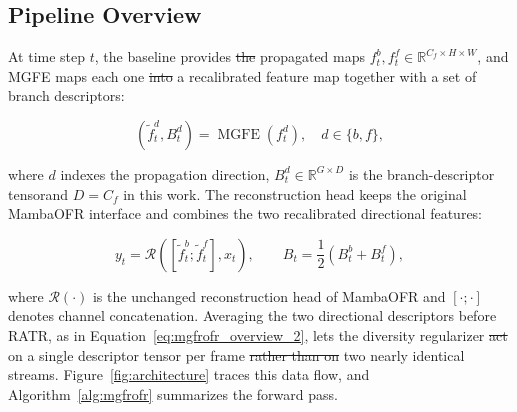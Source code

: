 \documentclass[symmetry,article,submit,pdftex,moreauthors]{Definitions/mdpi}
\providecommand{\DIFadd}[1]{{\protect\color{blue}\uwave{#1}}} %
\providecommand{\DIFdel}[1]{{\protect\color{red}\sout{#1}}}                      %
\providecommand{\DIFaddbegin}{} %
\providecommand{\DIFaddend}{} %
\providecommand{\DIFdelbegin}{} %
\providecommand{\DIFdelend}{} %
\begin{document}
\subsection{Pipeline Overview}
\label{subsec:overview}

At time step $t$, the baseline provides \DIFdelbegin \DIFdel{the }\DIFdelend propagated maps $f_t^{b}, f_t^{f} \in \mathbb{R}^{C_f \times H \times W}$, and MGFE maps each one \DIFdelbegin \DIFdel{into }\DIFdelend \DIFaddbegin \DIFadd{to }\DIFaddend a recalibrated feature map together with a set of branch descriptors:

\begin{equation}
\left(\widetilde{f}_t^{d}, B_t^{d}\right)=\operatorname{MGFE}\!\left(f_t^{d}\right), \quad d \in \{b,f\},
\end{equation}

where $d$ indexes the propagation direction, $B_t^{d} \in \mathbb{R}^{G \times D}$ is the branch-descriptor tensor\DIFaddbegin \DIFadd{, }\DIFaddend and $D=C_f$ in this work. The reconstruction head keeps the original MambaOFR interface and combines the two recalibrated directional features:

\begin{equation}
y_t = \mathcal{R}\!\left([\widetilde{f}_t^{b};\widetilde{f}_t^{f}], x_t\right),
\qquad
B_t = \frac{1}{2}\left(B_t^{b}+B_t^{f}\right),
\label{eq:mgfrofr_overview_2}
\end{equation}

where $\mathcal{R}(\cdot)$ is the unchanged reconstruction head of MambaOFR and $[\cdot;\cdot]$ denotes channel concatenation. Averaging the two directional descriptors before RATR, as in Equation~\eqref{eq:mgfrofr_overview_2}, lets the diversity regularizer \DIFdelbegin \DIFdel{act }\DIFdelend \DIFaddbegin \DIFadd{operate }\DIFaddend on a single descriptor tensor per frame \DIFdelbegin \DIFdel{rather than on }\DIFdelend \DIFaddbegin \DIFadd{instead of }\DIFaddend two nearly identical streams. Figure~\ref{fig:architecture} traces this data flow, and Algorithm~\ref{alg:mgfrofr} summarizes the forward pass.
\end{document}
